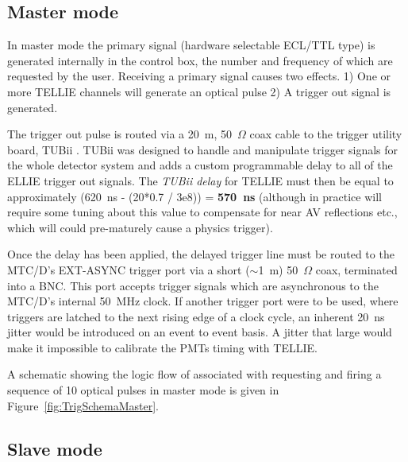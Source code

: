 \documentclass[12pt]{report}
\begin{document}
\subsection{Master mode}

In master mode the primary signal (hardware selectable ECL/TTL type) is generated internally in the control box, the number and frequency of which are requested by the user. Receiving a primary signal causes two effects. 1) One or more TELLIE channels will generate an optical pulse 2) A trigger out signal is generated. %

The trigger out pulse is routed via a 20~m, 50~$\Omega$ coax cable to the trigger utility board, TUBii \cite{tubii}. TUBii was designed to handle and manipulate trigger signals for the whole detector system and adds a custom programmable delay to all of the ELLIE trigger out signals. The \textit{TUBii delay} for TELLIE must then be equal to approximately (620~ns - (20*0.7 / 3e8)) = \textbf{570~ns} (although in practice will require some tuning about this value to compensate for near AV reflections etc., which will could pre-maturely cause a physics trigger).

Once the delay has been applied, the delayed trigger line must be routed to the MTC/D's EXT-ASYNC trigger port via a short ($\sim$1~m) 50~$\Omega$ coax, terminated into a BNC. This port accepts trigger signals which are asynchronous to the MTC/D's internal 50~MHz clock. If another trigger port were to be used, where triggers are latched to the next rising edge of a clock cycle, an inherent 20~ns jitter would be introduced on an event to event basis. A jitter that large would make it impossible to calibrate the PMTs timing with TELLIE. 

A schematic showing the logic flow of associated with requesting and firing a sequence of 10 optical pulses in master mode is given in Figure~\ref{fig:TrigSchemaMaster}.


\subsection{Slave mode}
\end{document}
